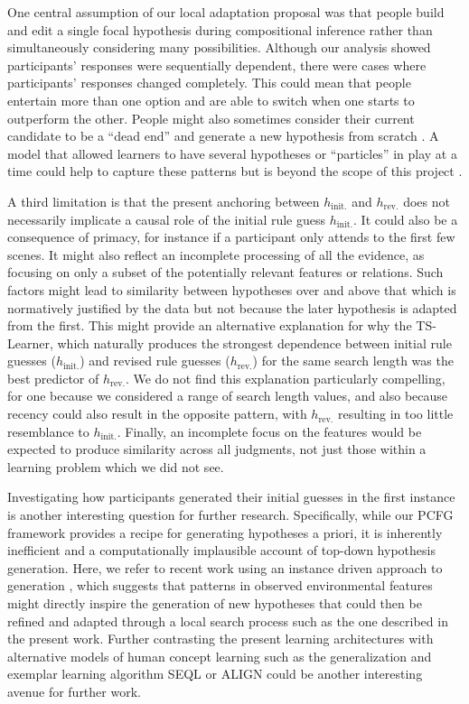 \documentclass[doc,natbib,floatsintext]{apa7}
\newcommand{\hr}{h_{\mathrm{rev.}}}
\newcommand{\hi}{h_{\mathrm{init.}}}
\begin{document}
One central assumption of our local adaptation proposal was that people build and edit a single focal hypothesis during compositional inference rather than simultaneously considering many possibilities. Although our analysis showed participants' responses were sequentially dependent, there were cases where participants' responses changed completely. This could mean that people entertain more than one option and are able to switch when one starts to outperform the other. People might also sometimes consider their current candidate to be a ``dead end'' and generate a new hypothesis from scratch \citep{speekenbrink2010learning}. A model that allowed learners to have several hypotheses or ``particles'' in play at a time could help to capture these patterns but is beyond the scope of this project \citep{daw2008pigeon,sanborn2010rational}.

A third limitation is that the present anchoring between $\hi$ and $\hr$ does not necessarily implicate a causal role of the initial rule guess $\hi$. It could also be a consequence of primacy, for instance if a participant only attends to the first few scenes. It might also reflect an incomplete processing of all the evidence, as focusing on only a subset of the potentially relevant features or relations. Such factors might lead to similarity between hypotheses over and above that which is normatively justified by the data but not because the later hypothesis is adapted from the first. This might provide an alternative explanation for why the TS-Learner, which naturally produces the strongest dependence between initial rule guesses ($\hi$) and revised rule guesses ($\hr$) for the same search length was the best predictor of $\hr$. We do not find this explanation particularly compelling, for one because we considered a range of search length values, and also because recency could also result in the opposite pattern, with $\hr$ resulting in too little resemblance to $\hi$. Finally, an incomplete focus on the features would be expected to produce similarity across all judgments, not just those within a learning problem which we did not see.

Investigating how participants generated their initial guesses in the first instance is another interesting question for further research. Specifically, while our PCFG framework provides a recipe for generating hypotheses a priori, it is inherently inefficient and a computationally implausible account of top-down hypothesis generation. Here, we refer to recent work using an instance driven approach to generation \citep{bramley2018grounding}, which suggests that patterns in observed environmental features might directly inspire the generation of new hypotheses that could then be refined and adapted through a local search process such as the one described in the present work. Further contrasting the present learning architectures with alternative models of human concept learning such as the generalization and exemplar learning algorithm SEQL \citep{kuehne2000seql, skorstad1988abstraction} or ALIGN \citep{mclure2010learning} could be another interesting avenue for further work. 
\end{document}

